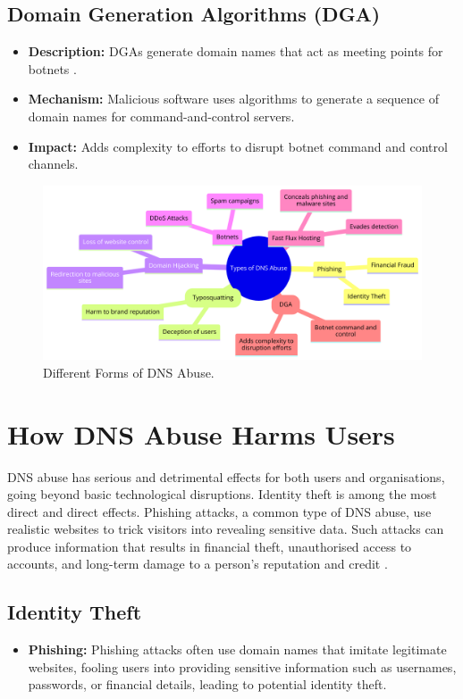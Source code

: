 \subsection{Domain Generation Algorithms (DGA)}
\begin{itemize}
    \item \textbf{Description:} DGAs generate domain names that act as meeting points for botnets \cite{antonakakis2012throw}.
    \item \textbf{Mechanism:} Malicious software uses algorithms to generate a sequence of domain names for command-and-control servers.
    \item \textbf{Impact:} Adds complexity to efforts to disrupt botnet command and control channels.
\end{itemize}
\captionsetup{font= footnotesize}
\begin{figure}[H]
\centering
\includegraphics[width=\textwidth]{background/DNSabuseForms.png}
\caption{Different Forms of DNS Abuse.}
\label{fig:figureThree}
\end{figure}



\section{How DNS Abuse Harms Users}

DNS abuse has serious and detrimental effects for both users and organisations, going beyond basic technological disruptions. Identity theft is among the most direct and direct effects. Phishing attacks, a common type of DNS abuse, use realistic websites to trick visitors into revealing sensitive data. Such attacks can produce information that results in financial theft, unauthorised access to accounts, and long-term damage to a person's reputation and credit \cite{godaddy2023dnsabuse}.

\subsection{Identity Theft}
\begin{itemize}
    \item \textbf{Phishing:} Phishing attacks often use domain names that imitate legitimate websites, fooling users into providing sensitive information such as usernames, passwords, or financial details, leading to potential identity theft.
\end{itemize}

